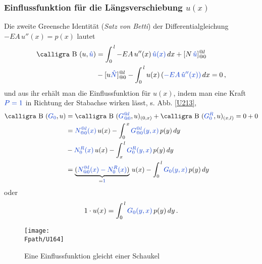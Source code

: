 {\textcolor{sectionTitleBlue}{\subsubsection{Einflussfunktion f\"{u}r die L\"{a}ngsverschiebung $u(x)$}}}
Die zweite Greensche Identit\"{a}t ({\em Satz von Betti\/}) der Differentialgleichung $-EA\,u''(x) = p(x)$ lautet
\begin{align}
\text{\normalfont\calligra B\,\,}(u,\textcolor{chapterTitleBlue}{\hat{u}}) &= \int_0^{\,l} - EA\,u''(x)\,\textcolor{chapterTitleBlue}{\hat{u}(x)}\,dx + [N\,\textcolor{chapterTitleBlue}{\hat{u}}]_{@0}^{@l}\nn \\
&- [u\textcolor{chapterTitleBlue}{\hat{N}}]_{@0}^{@l} - \int_0^{\,l} u(x)\,(\textcolor{chapterTitleBlue}{- EA\,\hat{u}''(x))}\,dx = 0\,,
\end{align}
und aus ihr erh\"{a}lt man die Einflussfunktion f\"{u}r $u(x) $, indem man eine Kraft $\textcolor{chapterTitleBlue}{P = 1} $ in Richtung der Stabachse wirken l\"{a}sst, s. Abb. \ref{U213},
\begin{align}
\text{\normalfont\calligra B\,\,}(\textcolor{chapterTitleBlue}{G_0},u) &= \text{\normalfont\calligra B\,\,}(\textcolor{chapterTitleBlue}{G_{@0}^{@l}},u)_{(0,x)} + \text{\normalfont\calligra B\,\,}(\textcolor{chapterTitleBlue}{G_0^R},u)_{(x,l)} = 0 + 0 \nn \\
&= \textcolor{chapterTitleBlue}{N_{@0}^{@l}(x)}\,u(x) - \int_0^{\,x} \textcolor{chapterTitleBlue}{G_{@0}^{@l}(y,x)}\,p(y)\,dy \nn \\
&- \textcolor{chapterTitleBlue}{N_0^R(x)}\,u(x) - \int_x^{\,l} \textcolor{chapterTitleBlue}{G_0^R(y,x)}\,p(y)\,dy\nn \\
&= \underbrace{(\textcolor{chapterTitleBlue}{N_{@0}^{@l}(x) - N_0^R(x)})}_{= \textcolor{chapterTitleBlue}{1}}\,u(x) - \int_0^{\,l} \textcolor{chapterTitleBlue}{G_0(y,x)}\,p(y)\,dy
\end{align}
oder
\begin{align}
1 \cdot u(x) = \int_0^{\,l} \textcolor{chapterTitleBlue}{G_0(y,x)}\,p(y)\,dy\,.
\end{align}

\begin{figure}[tbp]
\centering
\if {} \sidecaption \fi
\texttt{[image: \\Fpath/U164]}
\caption{Eine Einflussfunktion gleicht einer Schaukel} \label{U164A}
\end{figure}%

